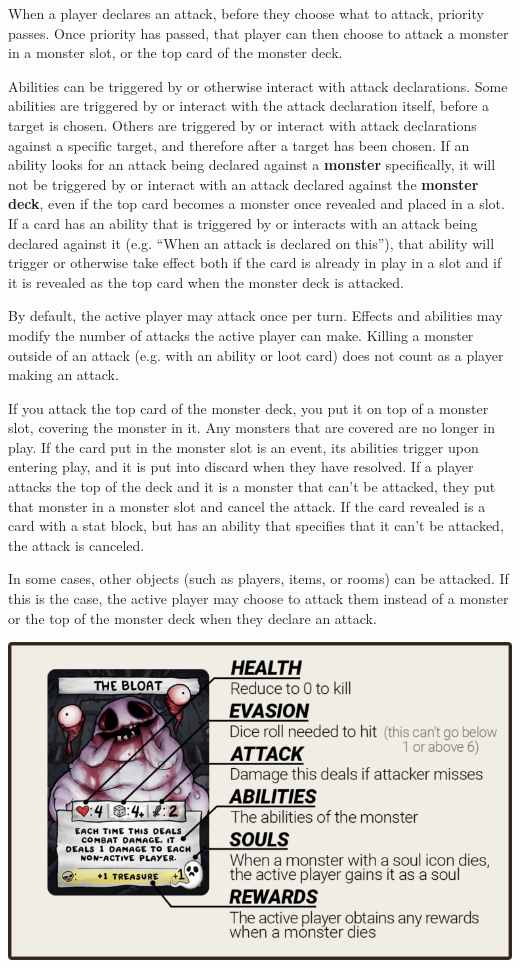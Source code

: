 \documentclass[
  fontsize=10pt,
  paper=a5,
  version=last,
  chapterprefix=true,
  bindingoffset=5mm,
  ]{scrbook}
\begin{document}
    When a player declares an attack, before they choose what to attack, priority passes. Once priority has passed, that player can then choose to attack a monster in a monster slot, or the top card of the monster deck.

    Abilities can be triggered by or otherwise interact with attack declarations. Some abilities are triggered by or interact with the attack declaration itself, before a target is chosen. Others are triggered by or interact with attack declarations against a specific target, and therefore after a target has been chosen. If an ability looks for an attack being declared against a \textbf{monster} specifically, it will not be triggered by or interact with an attack declared against the \textbf{monster deck}, even if the top card becomes a monster once revealed and placed in a slot. If a card has an ability that is triggered by or interacts with an attack being declared against it (e.g. “When an attack is declared on this”), that ability will trigger or otherwise take effect both if the card is already in play in a slot and if it is revealed as the top card when the monster deck is attacked.

    By default, the active player may attack once per turn. Effects and abilities may modify the number of attacks the active player can make. Killing a monster outside of an attack (e.g. with an ability or loot card) does not count as a player making an attack.

    If you attack the top card of the monster deck, you put it on top of a monster slot, covering the monster in it. Any monsters that are covered are no longer in play. If the card put in the monster slot is an event, its abilities trigger upon entering play, and it is put into discard when they have resolved. If a player attacks the top of the deck and it is a monster that can’t be attacked, they put that monster in a monster slot and cancel the attack. If the card revealed is a card with a stat block, but has an ability that specifies that it can’t be attacked, the attack is canceled.

    In some cases, other objects (such as players, items, or rooms) can be attacked. If this is the case, the active player may choose to attack them instead of a monster or the top of the monster deck when they declare an attack.
 
    \includegraphics[width=\textwidth]{assets/Monster-Stat-Breakdown-768x484.png}
\end{document}
